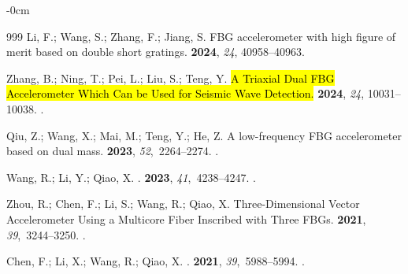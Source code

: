 \documentclass[sensors,article,accept,pdftex,moreauthors]{Definitions/mdpi}
\begin{document}
\begin{adjustwidth}{-\extralength}{0cm}
\begin{thebibliography}{999}
Li, F.; Wang, S.; Zhang, F.; Jiang, S.
\newblock FBG accelerometer with high figure of merit based on double short gratings.
 {\bf 2024}, \emph{24}, 40958--40963.

Zhang, B.; Ning, T.; Pei, L.; Liu, S.; Teng, Y.
\newblock \hl{A Triaxial Dual FBG Accelerometer Which Can be Used for Seismic Wave Detection.}
 {\bf 2024}, \emph{24}, 10031--10038.
.


Qiu, Z.; Wang, X.; Mai, M.; Teng, Y.; He, Z.
\newblock A low-frequency FBG accelerometer based on dual mass.
 {\bf 2023}, {\em 52},~2264--2274.
.

Wang, R.; Li, Y.; Qiao, X.
.
 {\bf 2023}, {\em 41},~4238--4247.
.

Zhou, R.; Chen, F.; Li, S.; Wang, R.; Qiao, X.
\newblock Three-Dimensional Vector Accelerometer Using a Multicore Fiber Inscribed with Three FBGs.
 {\bf 2021}, {\em 39},~3244--3250.
.

Chen, F.; Li, X.; Wang, R.; Qiao, X.
.
 {\bf 2021}, {\em 39},~5988--5994.
.


\end{thebibliography}
\end{adjustwidth}
\end{document}
